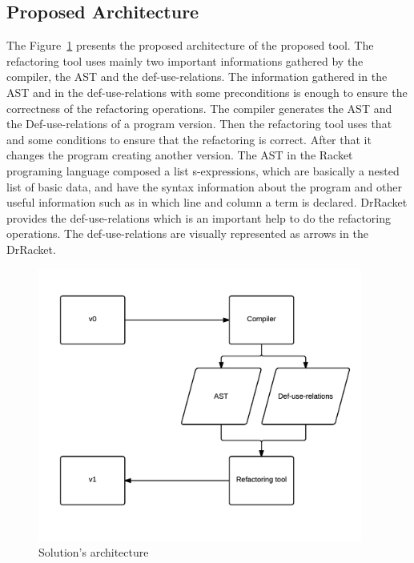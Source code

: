 \subsection{Proposed Architecture}

The Figure~\ref{fig:architecture} presents the proposed architecture of the proposed tool. 
The refactoring tool uses mainly two important informations gathered by the compiler, the AST and the def-use-relations.
The information gathered in the AST and in the def-use-relations with some preconditions is enough to ensure the correctness of the refactoring operations.
The compiler generates the AST and the Def-use-relations of a program version. Then the refactoring tool uses that and some conditions to ensure that the refactoring is correct. After that it changes the program creating another version.
The AST in the Racket programing language composed a list s-expressions, which are basically a nested list of basic data, and have the syntax information about the program and other useful information such as in which line and column a term is declared.
DrRacket provides the def-use-relations which is an important help to do the refactoring operations. The def-use-relations are visually represented as arrows in the DrRacket.

\begin{figure}[htbp]
	\centering
	\includegraphics[width=0.95\textwidth]{img/arquitectura.png}
	\caption{Solution's architecture}
	\label{fig:architecture}
\end{figure}


